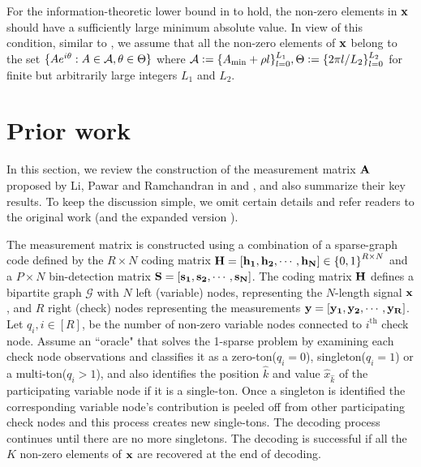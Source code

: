  
For the information-theoretic lower bound in \cite{wainwright2009information} to hold, the non-zero elements in $\mathbf{x}$ should have a sufficiently large minimum absolute value. In view of this condition, similar to \cite{li2015subisit,li2015subdraft}, we assume that all the non-zero elements of $\mathbf{x}$ belong to the set $\{Ae^{i\theta}:A\in\mathcal{A},\theta\in\Theta\}$ where $\mathcal{A}\mathrel{\mathop:}= \{A_{\text{min}}+\rho l\}^{L_1}_{l=0},\Theta\mathrel{\mathop:}=\{2\pi l/L_2\}_{l=0}^{L_2}$ for finite but arbitrarily large integers $L_1$ and $L_2$.

\section{Prior work}
\label{Sec:Review}
In this section, we review the construction of the measurement matrix $\mathbf{A}$ proposed by Li, Pawar and Ramchandran in \cite{li2015subisit} and \cite{li2015subdraft}, and also summarize their key results. To keep the discussion simple, we omit certain details and refer readers to the original work \cite{li2015subisit} (and the expanded version  \cite{li2015subdraft}).

The measurement matrix is constructed using a combination of a sparse-graph code defined by the $R \times N$ coding matrix ${\bf H=[h_1, h_2, \cdots ,h_{N}]} \in {\{0,1 \}}^{R \times N}$  and a $P \times N$ bin-detection matrix $\bf S=[s_1, s_2, \cdots ,s_N]$. The coding matrix $\bf H$ defines a bipartite graph $\mathcal{G}$ with $N$ left (variable) nodes, representing the $N$-length signal $\bf x$, and $R$ right (check) nodes representing the measurements  $\bf y=[y_1, y_2, \cdots, y_R]$. Let $q_i, i\in [R]$, be the number of non-zero variable nodes connected to $i^{\text{th}}$ check node. Assume an ``oracle" that solves the 1-sparse problem by examining each check node observations and classifies it as a zero-ton($q_i=0$), singleton($q_i=1$) or a multi-ton($q_i>1$), and also identifies the position $\hat{k}$ and value $\widehat{x}_{\hat{k}}$ of the participating variable node if it is a single-ton. Once a singleton is identified the corresponding variable node's contribution is peeled off from other participating check nodes and this process creates new single-tons. The decoding process continues until there are no more singletons. The decoding is successful if all the $K$ non-zero elements of $\bf x$ are recovered at the end of decoding.

